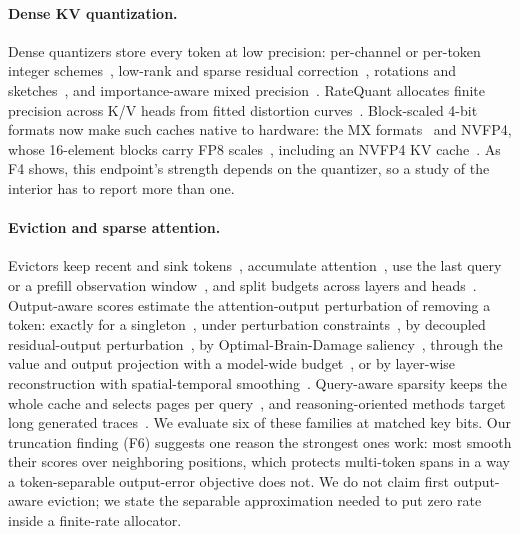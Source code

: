 \documentclass{article}
\theoremstyle{definition}
\begin{document}
\paragraph{Dense KV quantization.}
Dense quantizers store every token at low precision: per-channel or per-token integer schemes~\citep{liu2024kivi,hooper2024kvquant}, low-rank and sparse residual correction~\citep{kang2024gear}, rotations and sketches~\citep{zandieh2024qjl,zandieh2025turboquant}, and importance-aware mixed precision~\citep{yang2024mikv,he2024zipcache}.  RateQuant allocates finite precision across K/V heads from fitted distortion curves~\citep{zuo2026ratequant}.  Block-scaled 4-bit formats now make such caches native to hardware: the MX formats~\citep{ocp2023mx} and NVFP4, whose 16-element blocks carry FP8 scales~\citep{alvarez2025nvfp4}, including an NVFP4 KV cache~\citep{alvarez2025nvfp4kv}.  As F4 shows, this endpoint's strength depends on the quantizer, so a study of the interior has to report more than one.

\paragraph{Eviction and sparse attention.}
Evictors keep recent and sink tokens~\citep{xiao2024streamingllm}, accumulate attention~\citep{zhang2023h2o,liu2023scissorhands}, use the last query~\citep{oren2024tova} or a prefill observation window~\citep{li2024snapkv}, and split budgets across layers and heads~\citep{cai2024pyramidkv,feng2024adakv}.  Output-aware scores estimate the attention-output perturbation of removing a token: exactly for a singleton~\citep{goel2025caote}, under perturbation constraints~\citep{feng2026criticalkv}, by decoupled residual-output perturbation~\citep{zhang2026dropkv}, by Optimal-Brain-Damage saliency~\citep{gu2026obcache}, through the value and output projection with a model-wide budget~\citep{mai2026laprox}, or by layer-wise reconstruction with spatial-temporal smoothing~\citep{an2026restkv}.  Query-aware sparsity keeps the whole cache and selects pages per query~\citep{tang2024quest}, and reasoning-oriented methods target long generated traces~\citep{cai2025rkv,mao2026triattention}.  We evaluate six of these families at matched key bits.  Our truncation finding (F6) suggests one reason the strongest ones work: most smooth their scores over neighboring positions, which protects multi-token spans in a way a token-separable output-error objective does not.  We do not claim first output-aware eviction; we state the separable approximation needed to put zero rate inside a finite-rate allocator.
\end{document}
